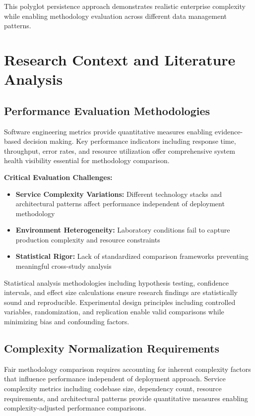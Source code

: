 This polyglot persistence approach demonstrates realistic enterprise complexity while enabling methodology evaluation across different data management patterns.

\section{Research Context and Literature Analysis}

\subsection{Performance Evaluation Methodologies}

Software engineering metrics provide quantitative measures enabling evidence-based decision making. Key performance indicators including response time, throughput, error rates, and resource utilization offer comprehensive system health visibility essential for methodology comparison.

\textbf{Critical Evaluation Challenges:}
\begin{itemize}
\item \textbf{Service Complexity Variations:} Different technology stacks and architectural patterns affect performance independent of deployment methodology
\item \textbf{Environment Heterogeneity:} Laboratory conditions fail to capture production complexity and resource constraints
\item \textbf{Statistical Rigor:} Lack of standardized comparison frameworks preventing meaningful cross-study analysis
\end{itemize}

Statistical analysis methodologies including hypothesis testing, confidence intervals, and effect size calculations ensure research findings are statistically sound and reproducible. Experimental design principles including controlled variables, randomization, and replication enable valid comparisons while minimizing bias and confounding factors.

\subsection{Complexity Normalization Requirements}

Fair methodology comparison requires accounting for inherent complexity factors that influence performance independent of deployment approach. Service complexity metrics including codebase size, dependency count, resource requirements, and architectural patterns provide quantitative measures enabling complexity-adjusted performance comparisons.

